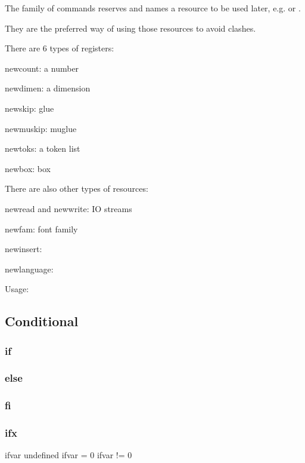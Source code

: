     The  family of commands reserves and names a resource to be used later, e.g.  or .

    They are the preferred way of using those resources to avoid clashes.

    There are 6 types of registers:

    \item{} newcount:  a number
    \item{} newdimen:  a dimension
    \item{} newskip:   glue
    \item{} newmuskip: muglue
    \item{} newtoks:   a token list
    \item{} newbox:    box

    There are also other types of resources:

    \item{} newread and newwrite: IO streams
    \item{} newfam:               font family
    \item{} newinsert:
    \item{} newlanguage:

    Usage:

    \newcount\x
    \number\x

  \subsection{Conditional}

    \subsubsection{if}

    \subsubsection{else}

    \subsubsection{fi}

    \subsubsection{ifx}

      \ifx\ifvar\undefined
        ifvar undefined
      \else
        \if{}
          ifvar = 0
        \else
          ifvar != 0
        \fi
      \fi

